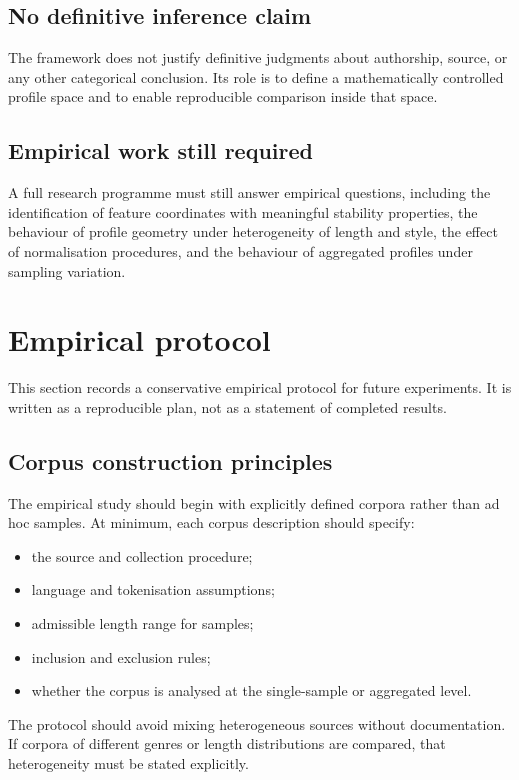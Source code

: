 \documentclass[11pt]{article}
\begin{document}
\subsection{No definitive inference claim}

The framework does not justify definitive judgments about authorship, source, or any other categorical conclusion. Its role is to define a mathematically controlled profile space and to enable reproducible comparison inside that space.

\subsection{Empirical work still required}

A full research programme must still answer empirical questions, including the identification of feature coordinates with meaningful stability properties, the behaviour of profile geometry under heterogeneity of length and style, the effect of normalisation procedures, and the behaviour of aggregated profiles under sampling variation.

\section{Empirical protocol}

This section records a conservative empirical protocol for future experiments. It is written as a reproducible plan, not as a statement of completed results.

\subsection{Corpus construction principles}

The empirical study should begin with explicitly defined corpora rather than ad hoc samples. At minimum, each corpus description should specify:
\begin{itemize}
    \item the source and collection procedure;
    \item language and tokenisation assumptions;
    \item admissible length range for samples;
    \item inclusion and exclusion rules;
    \item whether the corpus is analysed at the single-sample or aggregated level.
\end{itemize}

The protocol should avoid mixing heterogeneous sources without documentation. If corpora of different genres or length distributions are compared, that heterogeneity must be stated explicitly.
\end{document}
